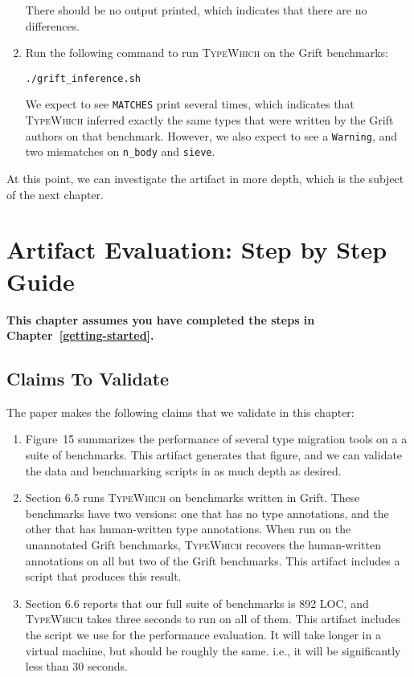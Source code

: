\documentclass{book}
\newcommand{\system}{\textsc{TypeWhich}\xspace}
\begin{document}
\begin{enumerate}
There should be no output printed, which indicates that there are no
differences.

\item Run the following command to run \system on the Grift benchmarks:
\begin{verbatim}
./grift_inference.sh
\end{verbatim}

We expect to see \texttt{MATCHES} print several times, which indicates that
\system inferred exactly the same types that were written by the Grift authors
on that benchmark. However, we also expect to see a \texttt{Warning}, and
two mismatches on \texttt{n\_body} and \texttt{sieve}.

\end{enumerate}

At this point, we can investigate the artifact in more depth, which is the
subject of the next chapter.

\chapter{Artifact Evaluation: Step by Step Guide}

\noindent
\textbf{This chapter assumes you have completed the steps in Chapter~\ref{getting-started}.}

\section{Claims To Validate}

The paper makes the following claims that we validate in this chapter:
\begin{enumerate}

    \item Figure~15 summarizes the performance of several type migration tools
    on a a suite of benchmarks. This artifact generates that figure, and we can
    validate the data and benchmarking scripts in as much depth as desired.

    \item Section 6.5 runs \system on benchmarks written in Grift. These
    benchmarks have two versions: one that has no type annotations, and the other
    that has human-written type annotations. When run on the unannotated Grift
    benchmarks, \system recovers the human-written annotations on all but two
    of the Grift benchmarks. This artifact includes a script that produces this
    result.

    \item Section 6.6 reports that our full suite of benchmarks is 892 LOC, and
    \system{} takes three seconds to run on all of them. This artifact includes
    the script we use for the performance evaluation. It will take longer in a
    virtual machine, but should be roughly the same. i.e., it will be
    significantly less than 30 seconds.

\end{enumerate}
\end{document}
